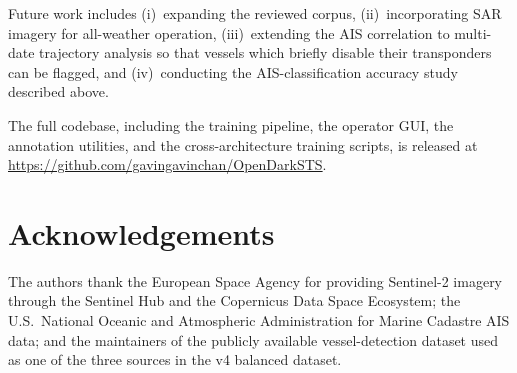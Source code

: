 \documentclass[10pt, letterpaper, twocolumn]{article}
\begin{document}
Future work includes (i)~expanding the reviewed corpus, (ii)~incorporating SAR imagery for all-weather operation, (iii)~extending the AIS correlation to multi-date trajectory analysis so that vessels which briefly disable their transponders can be flagged, and (iv)~conducting the AIS-classification accuracy study described above.

The full codebase, including the training pipeline, the operator GUI, the annotation utilities, and the cross-architecture training scripts, is released at \url{https://github.com/gavingavinchan/OpenDarkSTS}.


\section*{Acknowledgements}

The authors thank the European Space Agency for providing Sentinel-2 imagery through the Sentinel Hub and the Copernicus Data Space Ecosystem; the U.S.\ National Oceanic and Atmospheric Administration for Marine Cadastre AIS data; and the maintainers of the publicly available vessel-detection dataset used as one of the three sources in the v4 balanced dataset.


\printbibliography[title={References}]
\end{document}
